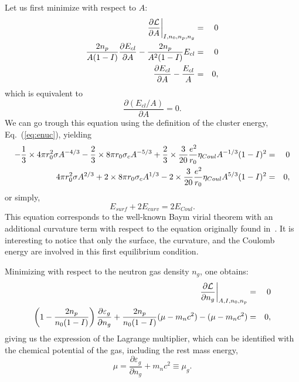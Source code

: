 Let us first minimize with respect to $A$:
%
\begin{eqnarray}
  \frac{\partial \mathcal{L}}{\partial A}\bigg|_{I,n_0,n_p,n_g} &=& 0 \notag\\
  \frac{2n_p}{A(1-I)}\frac{\partial E_{cl}}{\partial A} -
  \frac{2n_p}{A^2(1-I)}E_{cl} &=& 0 \notag\\
  \frac{\partial E_{cl}}{\partial A} - \frac{E_{cl}}{A} &=& 0,
\end{eqnarray}
%
which is equivalent to
%
\begin{equation}
  \frac{\partial (E_{cl}/A)}{\partial A} = 0.
\end{equation}
%
We can go trough this equation using the definition of the cluster energy, 
Eq.~(\ref{eq:enuc}), yielding
%
\begin{eqnarray}
  -\frac{1}{3}\times 4\pi r_0^2 \sigma A^{-4/3} - \frac{2}{3}\times 8\pi r_0\sigma_cA^{-5/3}
  + \frac{2}{3}\times\frac{3}{20}\frac{e^2}{r_0}\eta_{Coul}A^{-1/3}(1-I)^2 &=&
  0 \notag\\
  4\pi r_0^2 \sigma A^{2/3} + 2\times 8\pi r_0\sigma_cA^{1/3}
  - 2\times \frac{3}{20}\frac{e^2}{r_0}\eta_{Coul}A^{5/3}(1-I)^2 &=& 0 \notag,
\end{eqnarray}
or simply,
%
\begin{equation}
  E_{surf} + 2E_{curv} = 2E_{Coul}.\label{eq:virial}
\end{equation}
%
This equation corresponds to the well-known Baym virial theorem with an 
additional curvature term with respect to the equation originally found 
in~\cite{BBP}. It is interesting to notice that only the surface, the 
curvature, and the Coulomb energy are involved in this first equilibrium 
condition.

Minimizing with respect to the neutron gas density $n_g$, one obtains:
%
\begin{eqnarray}
  \frac{\partial \mathcal{L}}{\partial n_g}\bigg|_{A,I,n_0,n_p} &=& 0 \notag\\
  \left(1-\frac{2n_p}{n_0(1-I)}\right)\frac{\partial \varepsilon_g}{\partial
n_g} + \frac{2n_p}{n_0(1-I)}(\mu - m_nc^2) - (\mu - m_nc^2) &=& 0,
\end{eqnarray}
%
giving us the expression of the Lagrange multiplier, which can be identified
with the chemical potential of the gas, including the rest mass energy,
%
\begin{equation}
  \mu = \frac{\partial \varepsilon_g}{\partial n_g} + m_nc^2 \equiv
  \mu_g.\label{eq:lagrange}
\end{equation}
%

